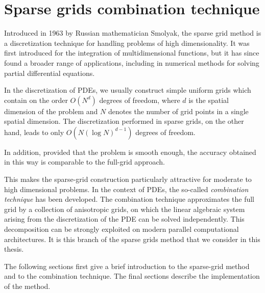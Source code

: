 
\chapter{Sparse grids combination technique}





Introduced in 1963 by Russian mathematician Smolyak\cite{smolyak}, the sparse grid method
is a discretization technique for handling problems of high dimensionality.
It was first introduced for the integration of multidimensional functions,
but it has since found a broader range of applications, including in
numerical methods for solving partial differential equations.

In the discretization of PDEs, we usually construct
simple uniform grids which contain on the order $O(N^d)$ degrees of freedom,
where $d$ is the spatial dimension of the problem and $N$
denotes the number of grid points in a single spatial dimension.
The discretization performed in sparse grids, on the other hand,
leads to only $O(N(\log{N})^{d-1})$ degrees of freedom.\cite{sg_123}

In addition, provided that the problem is smooth enough, 
the accuracy obtained in this way is comparable to the full-grid approach.

This makes the sparse-grid construction particularly attractive for
moderate to high dimensional problems.
In the context of PDEs, the so-called \emph{combination technique} has been developed.\cite{combitech}
The combination technique approximates the full grid by a collection of anisotropic grids,
on which the linear algebraic system
arising from the discretization of the PDE can be solved independently.
This decomposition can be strongly exploited on modern parallel computational
architectures. \cite{combitech}
It is this branch of the sparse grids method that we consider in this thesis.

The following sections first give a brief introduction to the sparse-grid method and
to the combination technique.
The final sections describe the implementation of the method.



